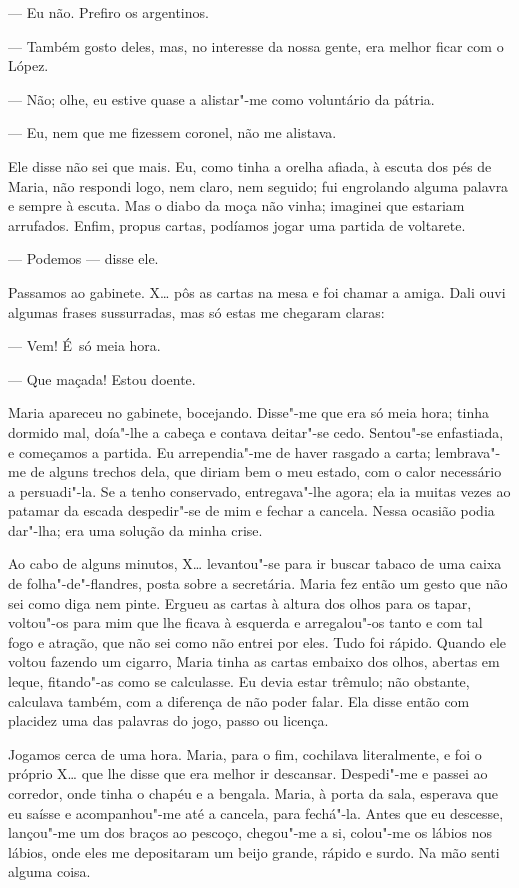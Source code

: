 \begin{linenumbers}
--- Eu não. Prefiro os argentinos.

--- Também gosto deles, mas, no interesse da nossa gente, era melhor
ficar com o López.

--- Não; olhe, eu estive quase a alistar"-me como voluntário da pátria.

--- Eu, nem que me fizessem coronel, não me alistava.

Ele disse não sei que mais. Eu, como tinha a orelha afiada, à escuta dos
pés de Maria, não respondi logo, nem claro, nem seguido; fui engrolando
alguma palavra e sempre à escuta. Mas o diabo da moça não vinha;
imaginei que estariam arrufados. Enfim, propus cartas, podíamos jogar
uma partida de voltarete.

--- Podemos --- disse ele.

Passamos ao gabinete. X\ldots{} pôs as cartas na mesa e foi chamar a amiga.
Dali ouvi algumas frases sussurradas, mas só estas me chegaram claras:

--- Vem! É~só meia hora.

--- Que maçada! Estou doente.

Maria apareceu no gabinete, bocejando. Disse"-me que era só meia hora;
tinha dormido mal, doía"-lhe a cabeça e contava deitar"-se cedo. Sentou"-se
enfastiada, e começamos a partida. Eu arrependia"-me de haver rasgado a
carta; lembrava"-me de alguns trechos dela, que diriam bem o meu estado,
com o calor necessário a persuadi"-la. Se a tenho conservado,
entregava"-lhe agora; ela ia muitas vezes ao patamar da escada
despedir"-se de mim e fechar a cancela. Nessa ocasião podia dar"-lha; era
uma solução da minha crise.

Ao cabo de alguns minutos, X\ldots{} levantou"-se para ir buscar tabaco de uma
caixa de folha"-de"-flandres, posta sobre a secretária. Maria fez então um
gesto que não sei como diga nem pinte. Ergueu as cartas à altura dos
olhos para os tapar, voltou"-os para mim que lhe ficava à esquerda e
arregalou"-os tanto e com tal fogo e atração, que não sei como não entrei
por eles. Tudo foi rápido. Quando ele voltou fazendo um cigarro, Maria
tinha as cartas embaixo dos olhos, abertas em leque, fitando"-as como se
calculasse. Eu devia estar trêmulo; não obstante, calculava também, com
a diferença de não poder falar. Ela disse então com placidez uma das
palavras do jogo, passo ou licença.

Jogamos cerca de uma hora. Maria, para o fim, cochilava literalmente, e
foi o próprio X\ldots{} que lhe disse que era melhor ir descansar. Despedi"-me
e passei ao corredor, onde tinha o chapéu e a bengala. Maria, à porta da
sala, esperava que eu saísse e acompanhou"-me até a cancela, para
fechá"-la. Antes que eu descesse, lançou"-me um dos braços ao pescoço,
chegou"-me a si, colou"-me os lábios nos lábios, onde eles me depositaram
um beijo grande, rápido e surdo. Na mão senti alguma coisa.


\end{linenumbers}
